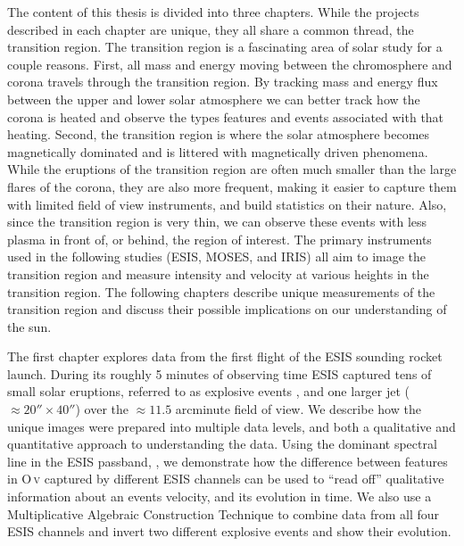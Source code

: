 The content of this thesis is divided into three chapters.  
While the projects described in each chapter are unique, they all share a common thread, the transition region.
The transition region is a fascinating area of solar study for a couple reasons.
First, all mass and energy moving between the chromosphere and corona travels through the transition region.
By tracking mass and energy flux between the upper and lower solar atmosphere we can better track how the corona is heated and observe the types features and events associated with that heating.
Second, the transition region is where the solar atmosphere becomes magnetically dominated and is littered with magnetically driven phenomena.
While the eruptions of the transition region are often much smaller than the large flares of the corona, they are also more frequent, making it easier to capture them with limited field of view instruments, and build statistics on their nature.
Also, since the transition region is very thin, we can observe these events with less plasma in front of, or behind, the region of interest. 
The primary instruments used in the following studies (ESIS, MOSES, and IRIS) all aim to image the transition region and measure intensity and velocity at various heights in the transition region.
The following chapters describe unique measurements of the transition region and discuss their possible implications on our understanding of the sun.

 The first chapter explores data from the first flight of the ESIS sounding rocket launch. 
During its roughly 5 minutes of observing time ESIS captured tens of small solar eruptions, referred to as explosive events \citep{Dere1989}, and one larger jet ($\approx 20''\times40''$) over the $\approx11.5$ arcminute field of view.
We describe how the unique images were prepared into multiple data levels, and both a qualitative and quantitative approach to understanding the data.
Using the dominant spectral line in the ESIS passband, , we demonstrate how the difference between features in O\,\textsc{v} captured by different ESIS channels can be used to ``read off'' qualitative information about an events velocity, and its evolution in time.
We also use a Multiplicative Algebraic Construction Technique \citep[MART:][]{Okamoto1991,Verhoeven1993} to combine data from all four ESIS channels and invert two different explosive events and show their evolution.

